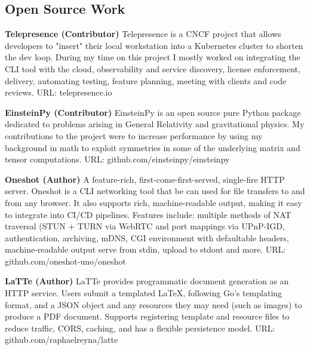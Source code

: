 \documentclass[margin]{./res}
\begin{document}
  

\address{Email: raphaelreyna@protonmail.com \\
  Site: rreyna.dev}
                           
                        
\begin{resume} 
\section{Open Source Work}
{\bf Telepresence (Contributor)}\newline
Telepresence is a CNCF project that allows developers to "insert" their local workstation into a Kubernetes cluster to shorten the dev loop.
During my time on this project I mostly worked on integrating the CLI tool with the cloud, observability and service discovery, license enforcement, delivery, automating testing, feature planning, meeting with clients and code reviews.\newline
URL: telepresence.io

{\bf EinsteinPy (Contributor)}\newline
EinsteinPy is an open source pure Python package dedicated to problems arising in General Relativity and gravitational physics.
My contributions to the project were to increase performance by using my background in math to exploit symmetries in some of the underlying matrix and tensor computations.\newline
URL: github.com/einsteinpy/einsteinpy

{\bf Oneshot (Author)}\newline
A feature-rich, first-come-first-served, single-fire HTTP server. Oneshot is a CLI networking tool that be can used for file transfers to and from any browser. It also supports rich, machine-readable output, making it easy to integrate into CI/CD pipelines.
Features include: multiple methods of NAT traversal (STUN + TURN via WebRTC and port mappings via UPnP-IGD, authentication, archiving, mDNS, CGI environment with defaultable headers, machine-readable output serve from stdin, upload to stdout and more.\newline
URL: github.com/oneshot-uno/oneshot

{\bf LaTTe (Author)}\newline
LaTTe provides programmatic document generation as an HTTP service.
Users submit a templated LaTeX, following Go's templating format, and a JSON object and any resources they may need (such as images) to produce
a PDF document. Supports registering template and resource files to reduce traffic, CORS, caching, and has a flexible persistence model.\newline
URL: github.com/raphaelreyna/latte


\end{resume}
\end{document}
